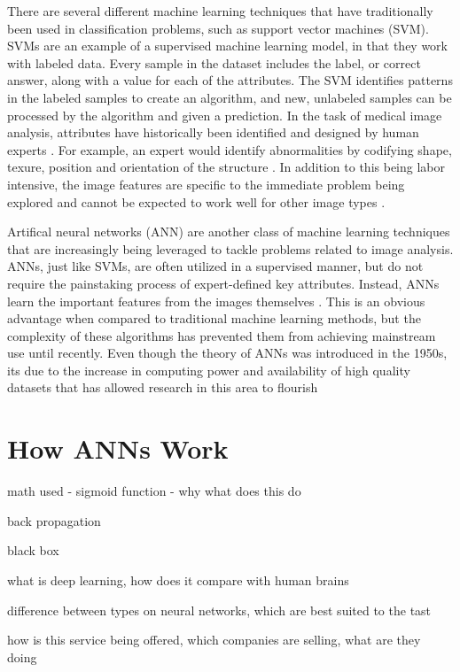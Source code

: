 \documentclass[sigconf]{acmart}
\begin{document}
There are several different machine learning techniques that have traditionally been used in classification problems, such as support vector machines (SVM). SVMs are an example of a supervised machine learning model, in that they work with labeled data. Every sample in the dataset includes the label, or correct answer, along with a value for each of the attributes. The SVM identifies patterns in the labeled samples to create an algorithm, and new, unlabeled samples can be processed by the algorithm and given a prediction. In the task of medical image analysis, attributes have historically been identified and designed by human experts \cite{cite06}. For example, an expert would identify abnormalities by codifying shape, texure, position and orientation of the structure \cite{cite07}.  In addition to this being labor intensive, the image features are specific to the immediate problem being explored and cannot be expected to work well for other image types \cite{cite06}.

Artifical neural networks (ANN) are another class of machine learning techniques that are increasingly being leveraged to tackle problems related to image analysis. ANNs, just like SVMs, are often utilized in a supervised manner, but do not require the painstaking process of expert-defined key attributes. Instead, ANNs learn the important features from the images themselves \cite{cite07}. This is an obvious advantage when compared to traditional machine learning methods, but the complexity of these algorithms has prevented them from achieving mainstream use until recently. Even though the theory of ANNs was introduced in the 1950s, its due to the increase in computing power and availability of high quality datasets that has allowed research in this area to flourish \cite{cite05}

\section{How ANNs Work}





math used - sigmoid function - why what does this do

back propagation

black box

what is deep learning, how does it compare with human brains

difference between types on neural networks, which are best suited to the tast

how is this service being offered, which companies are selling, what are they doing
\end{document}
